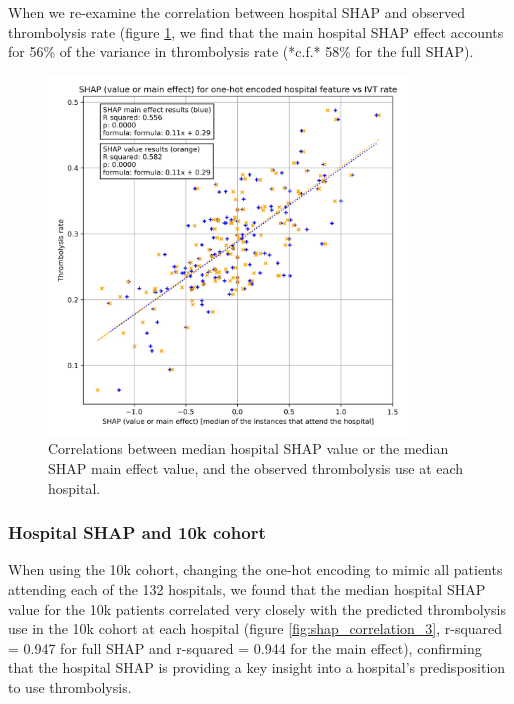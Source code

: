 When we re-examine the correlation between hospital SHAP and observed thrombolysis rate (figure \ref{fig:shap_correlation_2}, we find that the main hospital SHAP effect accounts for 56\% of the variance in thrombolysis rate (*c.f.* 58\% for the full SHAP).

\begin{figure}
\centering
\includegraphics[width=0.85\textwidth]{./images/03c_xgb_10_features_attended_hosp_shap_value_and_main_effect_vs_ivt_rate}
\caption{Correlations between median hospital SHAP value or the median SHAP main effect value, and the observed thrombolysis use at each hospital.}
\label{fig:shap_correlation_2}
\end{figure}


\subsubsection{Hospital SHAP and 10k cohort}

When using the 10k cohort, changing the one-hot encoding to mimic all patients attending each of the 132 hospitals, we found that the median hospital SHAP value for the 10k patients correlated very closely with the predicted thrombolysis use in the 10k cohort at each hospital (figure \ref{fig:shap_correlation_3}, r-squared = 0.947 for full SHAP and r-squared = 0.944 for the main effect), confirming that the hospital SHAP is providing a key insight into a hospital's predisposition to use thrombolysis.

